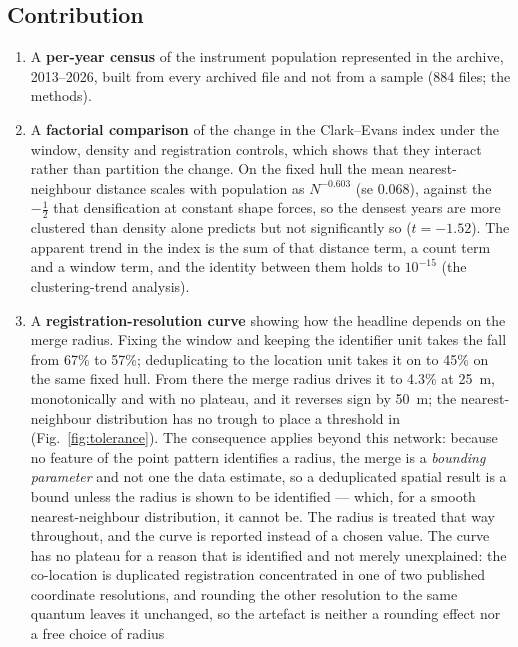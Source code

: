 \documentclass[fleqn,10pt,lineno]{wlpeerj}
\newcommand{\nArchiveFiles}{884}
\newcommand{\rDrop}{67}
\newcommand{\cleanSlopeLoc}{-0.603}
\newcommand{\cleanSELoc}{0.068}
\newcommand{\cleanTLoc}{-1.52}
\newcommand{\locHullDrop}{45}
\newcommand{\rHullDrop}{57}
\begin{document}
\subsection*{Contribution}
\label{sec:contribution}

\begin{enumerate}
\item A \textbf{per-year census} of the instrument population represented in the archive,
2013--2026, built from every archived file and not from a sample (\nArchiveFiles{} files;
the methods).
\item A \textbf{factorial comparison} of the change in the Clark--Evans index under the window,
density and registration controls, which shows that they interact rather than partition the
change. On the fixed hull the mean nearest-neighbour distance scales with
population as $N^{\cleanSlopeLoc}$ (se \cleanSELoc), against the $-\tfrac12$ that densification
at constant shape forces, so the densest years are more clustered than density alone predicts but
not significantly so ($t = \cleanTLoc$). The apparent trend in the index is the sum of that
distance term, a count term and a window term, and the identity between them holds to
$10^{-15}$ (the clustering-trend analysis).
\item A \textbf{registration-resolution curve} showing how the headline depends on the merge
radius. Fixing the window and keeping the identifier unit takes the fall from \rDrop\% to
\rHullDrop\%; deduplicating to the location unit takes it on to \locHullDrop\% on the same fixed
hull. From there the merge radius drives it to \num{4.3}\% at \SI{25}{\meter}, monotonically and
with no plateau, and it reverses sign
by \SI{50}{\meter}; the nearest-neighbour distribution has no trough to place a threshold in
(Fig.~\ref{fig:tolerance}). The consequence applies beyond this network:
because no feature of the point pattern identifies a radius, the merge is a \emph{bounding
parameter} and not one the data estimate, so a deduplicated spatial result is a bound unless the
radius is shown to be identified --- which, for a smooth nearest-neighbour distribution, it
cannot be. The radius is treated that way throughout, and the curve is reported instead of a
chosen value. The curve has no plateau for a reason that is identified and not merely
unexplained: the
co-location is duplicated registration concentrated in one of two published coordinate
resolutions, and rounding the other resolution to the same quantum leaves it unchanged, so the
artefact is neither a rounding effect nor a free choice of radius

\end{enumerate}
\end{document}
